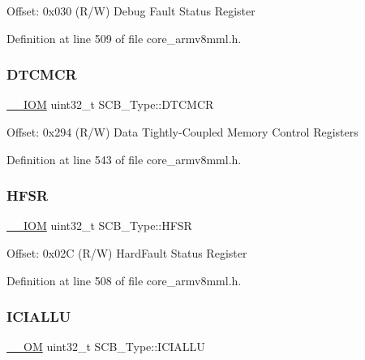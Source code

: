 Offset\+: 0x030 (R/W) Debug Fault Status Register 

Definition at line 509 of file core\+\_\+armv8mml.\+h.

\mbox{\label{struct_s_c_b___type_a2836e932734240076ce91cf4484cdf43}} 
\subsubsection{\texorpdfstring{D\+T\+C\+M\+CR}{DTCMCR}}
{\footnotesize\ttfamily \hyperlink{core__sc300_8h_ab6caba5853a60a17e8e04499b52bf691}{\+\_\+\+\_\+\+I\+OM} uint32\+\_\+t S\+C\+B\+\_\+\+Type\+::\+D\+T\+C\+M\+CR}

Offset\+: 0x294 (R/W) Data Tightly-\/\+Coupled Memory Control Registers 

Definition at line 543 of file core\+\_\+armv8mml.\+h.

\mbox{\label{struct_s_c_b___type_a14ad254659362b9752c69afe3fd80934}} 
\subsubsection{\texorpdfstring{H\+F\+SR}{HFSR}}
{\footnotesize\ttfamily \hyperlink{core__sc300_8h_ab6caba5853a60a17e8e04499b52bf691}{\+\_\+\+\_\+\+I\+OM} uint32\+\_\+t S\+C\+B\+\_\+\+Type\+::\+H\+F\+SR}

Offset\+: 0x02C (R/W) Hard\+Fault Status Register 

Definition at line 508 of file core\+\_\+armv8mml.\+h.

\mbox{\label{struct_s_c_b___type_a573260e7836dbc43707df97dd475a0c8}} 
\subsubsection{\texorpdfstring{I\+C\+I\+A\+L\+LU}{ICIALLU}}
{\footnotesize\ttfamily \hyperlink{core__sc300_8h_a0ea2009ed8fd9ef35b48708280fdb758}{\+\_\+\+\_\+\+OM} uint32\+\_\+t S\+C\+B\+\_\+\+Type\+::\+I\+C\+I\+A\+L\+LU}

